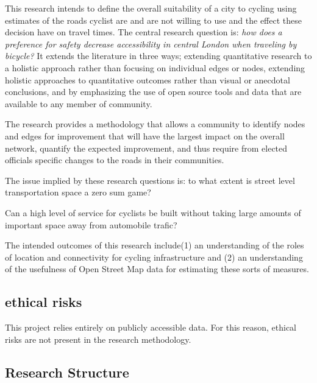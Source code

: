 This research intends to define the overall suitability of a city to cycling using estimates of the roads cyclist are and are not willing to use and the effect these decision have on travel times. The central research question is: \textit{how does a preference for safety decrease accessibility in central London when traveling by bicycle?} It extends the literature in three ways; extending quantitative research to a holistic approach rather than focusing on individual edges or nodes, extending holistic approaches to quantitative outcomes rather than visual or anecdotal conclusions, and by emphasizing the use of open source tools and data that are available to any member of community. 

The research provides a methodology that allows a community to identify nodes and edges for improvement that will have the largest impact on the overall network, quantify the expected improvement, and thus require from elected officials specific changes to the roads in their communities.  

The issue implied by these research questions is: to what extent is street level transportation space a zero sum game? 

Can a high level of service for cyclists be built without taking large amounts of important space away from automobile trafic? 

The intended outcomes of this research include(1) an understanding of the roles of location and connectivity for cycling infrastructure and (2) an understanding of the usefulness of Open Street Map data for estimating these sorts of measures. 


\subsection{ethical risks}

This project relies entirely on publicly accessible data. For this reason, ethical risks are not present in the research methodology.  

\subsection{Research Structure}

